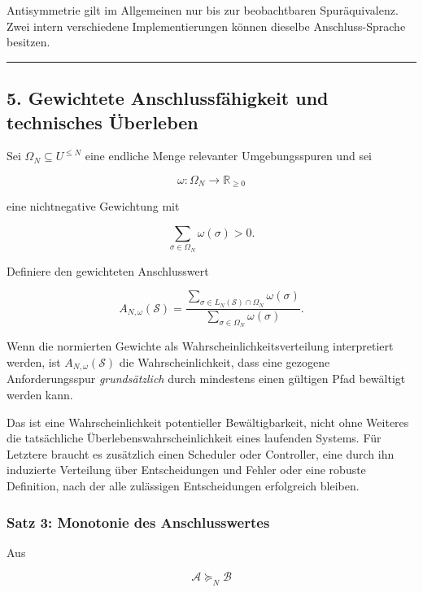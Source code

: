 \documentclass[
  10pt,
  a4paper,
]{article}
\begin{document}
Antisymmetrie gilt im Allgemeinen nur bis zur beobachtbaren
Spuräquivalenz. Zwei intern verschiedene Implementierungen können
dieselbe Anschluss-Sprache besitzen.

\begin{center}\rule{0.5\linewidth}{0.5pt}\end{center}

\hypertarget{gewichtete-anschlussfuxe4higkeit-und-technisches-uxfcberleben}{%
\subsection{5. Gewichtete Anschlussfähigkeit und technisches
Überleben}\label{gewichtete-anschlussfuxe4higkeit-und-technisches-uxfcberleben}}

Sei \(\Omega_N\subseteq U^{\le N}\) eine endliche Menge relevanter
Umgebungsspuren und sei

\[
\omega:\Omega_N\to\mathbb R_{\ge 0}
\]

eine nichtnegative Gewichtung mit

\[
\sum_{\sigma\in\Omega_N}\omega(\sigma)>0.
\]

Definiere den gewichteten Anschlusswert

\[
A_{N,\omega}(\mathcal S)
=
\frac{
\sum_{\sigma\in L_N(\mathcal S)\cap\Omega_N}\omega(\sigma)
}{
\sum_{\sigma\in\Omega_N}\omega(\sigma)
}.
\]

Wenn die normierten Gewichte als Wahrscheinlichkeitsverteilung
interpretiert werden, ist \(A_{N,\omega}(\mathcal S)\) die
Wahrscheinlichkeit, dass eine gezogene Anforderungsspur
\emph{grundsätzlich} durch mindestens einen gültigen Pfad bewältigt
werden kann.

Das ist eine Wahrscheinlichkeit potentieller Bewältigbarkeit, nicht ohne
Weiteres die tatsächliche Überlebenswahrscheinlichkeit eines laufenden
Systems. Für Letztere braucht es zusätzlich einen Scheduler oder
Controller, eine durch ihn induzierte Verteilung über Entscheidungen und
Fehler oder eine robuste Definition, nach der alle zulässigen
Entscheidungen erfolgreich bleiben.

\hypertarget{satz-3-monotonie-des-anschlusswertes}{%
\subsubsection{Satz 3: Monotonie des
Anschlusswertes}\label{satz-3-monotonie-des-anschlusswertes}}

Aus

\[
\mathcal A\succeq_N\mathcal B
\]
\end{document}
